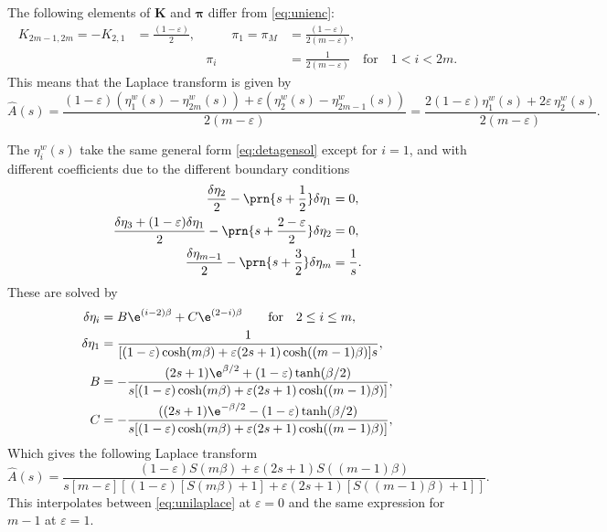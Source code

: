 \documentclass[12pt]{article}
\newcommand{\eqm}{\pi}
\newcommand{\eq}{\boldsymbol{\eqm}}
\newcommand{\etwm}{\eta^w}
\newcommand{\encm}{K}
\newcommand{\enc}{\mathbf{\encm}}
\begin{document}
The following elements of $\enc$ and $\eq$ differ from \eqref{eq:unienc}:
%
\begin{equation}\label{eq:shortenenc}
  \begin{aligned}
  \encm_{2m-1,2m} = -\encm_{2,1} &= \frac{(1-\varepsilon)}{2},
  &\qquad
  \eqm_1 = \eqm_M &= \frac{(1-\varepsilon)}{2(m-\varepsilon)},
  \\ &&
  \eqm_i &=  \frac{1}{2(m-\varepsilon)}
  \quad\text{for}\quad 1<i<2m.
  \end{aligned}
\end{equation}
%
This means that the Laplace transform is given by
%
\begin{equation}\label{eq:shortenareaeta}
  \hat{A}(s) = \frac{(1-\varepsilon)(\etwm_1(s)-\etwm_{2m}(s)) 
                      + \varepsilon(\etwm_2(s)-\etwm_{2m-1}(s))}
                    {2(m-\varepsilon)}
       = \frac{2(1-\varepsilon) \etwm_1(s) + 2\varepsilon\,\etwm_2(s)}
              {2(m-\varepsilon)}.
\end{equation}
%

The $\etwm_i(s)$ take the same general form \eqref{eq:detagensol} except for $i=1$, and with different coefficients due to the different boundary conditions
%
\begin{equation}\label{eq:detabndshorten}
\begin{aligned}
  \frac{\delta\eta_2}{2} - \prn{s+\frac{1}{2}}\delta\eta_1 &= 0, \\
  \frac{\delta\eta_3 + (1-\varepsilon)\delta\eta_1}{2} - \prn{s+\frac{2-\varepsilon}{2}}\delta\eta_2 &= 0, \\
  \frac{\delta\eta_{m-1}}{2} - \prn{s+\frac{3}{2}}\delta\eta_{m} &= \frac{1}{s}.
\end{aligned}
\end{equation}
%
These are solved by
%
%
\begin{equation}\label{eq:shortensol}
\begin{aligned}
  \delta\eta_i &= B\e^{(i-2)\beta} + C\e^{(2-i)\beta} \qquad
        \text{for} \quad 2 \leq i \leq m, \\
  \delta\eta_1 &= \frac{1}
         {[(1-\varepsilon)\cosh(m\beta) + \varepsilon(2s+1)\cosh((m-1)\beta)]s}, \\
  B &= - \frac{(2s+1) \e^{\beta/2} + (1-\varepsilon) \tanh(\beta/2)}
         {s [(1-\varepsilon)\cosh(m\beta) + \varepsilon(2s+1)\cosh((m-1)\beta)]}, \\
  C &= - \frac{((2s+1) \e^{-\beta/2} - (1-\varepsilon) \tanh(\beta/2)}
         {s [(1-\varepsilon)\cosh(m\beta) + \varepsilon(2s+1)\cosh((m-1)\beta)]}, \\
\end{aligned}
\end{equation}
%
Which gives the following Laplace transform
%
\begin{equation}\label{eq:shortenlaplace}
  \hat{A}(s) = \frac{(1-\varepsilon) S(m\beta) + \varepsilon(2s+1) S((m-1)\beta)}
          { s [m-\varepsilon]
            [(1-\varepsilon)[S(m\beta) + 1] + \varepsilon(2s+1)[S((m-1)\beta) + 1]] }.
\end{equation}
%
This interpolates between \eqref{eq:unilaplace} at $\varepsilon=0$ and the same expression for $m-1$ at $\varepsilon=1$.
\end{document}
